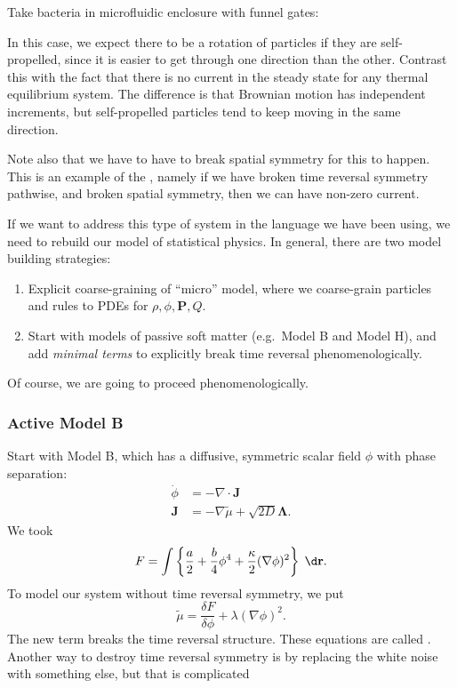 \documentclass[a4paper]{article}
\begin{document}
\begin{eg}
  Take bacteria in microfluidic enclosure with funnel gates:
  \begin{center}
  \end{center}

  In this case, we expect there to be a rotation of particles if they are self-propelled, since it is easier to get through one direction than the other. Contrast this with the fact that there is no current in the steady state for any thermal equilibrium system. The difference is that Brownian motion has independent increments, but self-propelled particles tend to keep moving in the same direction.

  Note also that we have to have to break spatial symmetry for this to happen. This is an example of the , namely if we have broken time reversal symmetry pathwise, and broken spatial symmetry, then we can have non-zero current.
\end{eg}
If we want to address this type of system in the language we have been using, we need to rebuild our model of statistical physics. In general, there are two model building strategies:
\begin{enumerate}
  \item Explicit coarse-graining of ``micro'' model, where we coarse-grain particles and rules to PDEs for $\rho, \phi, \mathbf{P}, Q$.
  \item Start with models of passive soft matter (e.g.\ Model B and Model H), and add \emph{minimal terms} to explicitly break time reversal phenomenologically.
\end{enumerate}

Of course, we are going to proceed phenomenologically.
\subsubsection*{Active Model B}
Start with Model B, which has a diffusive, symmetric scalar field $\phi$ with phase separation:
\begin{align*}
  \dot{\phi} &= - \nabla \cdot \mathbf{J}\\
  \mathbf{J} &= - \nabla \tilde{\mu} + \sqrt{2D} \boldsymbol\Lambda.
\end{align*}
We took
\[
  F = \int \left\{\frac{a}{2} + \frac{b}{4} \phi^4 + \frac{\kappa}{2} (\nabla \phi)^2 \right\} \;\d \mathbf{r}.
\]
To model our system without time reversal symmetry, we put
\[
  \tilde{\mu} = \frac{\delta F}{\delta \phi} + \lambda (\nabla \phi)^2.
\]
The new term breaks the time reversal structure. These equations are called . Another way to destroy time reversal symmetry is by replacing the white noise with something else, but that is complicated
\end{document}
